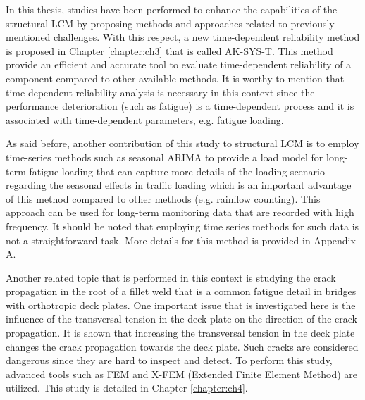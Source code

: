 In this thesis, studies have been performed to enhance the capabilities of the structural LCM by proposing methods and approaches related to previously mentioned challenges. With this respect,
a new time-dependent reliability method is proposed in Chapter \ref{chapter:ch3} that is called AK-SYS-T. This method provide an efficient and accurate tool to evaluate time-dependent reliability
of a component compared to other available methods. It is worthy to mention that time-dependent reliability analysis is necessary in this context since the performance deterioration (such as fatigue) 
is a time-dependent process and it is associated with time-dependent parameters, e.g. fatigue loading. 

As said before, another contribution of this study to structural LCM is to employ time-series methods such as seasonal ARIMA to provide a load model for long-term fatigue loading that can capture more 
details of the loading scenario regarding the seasonal effects in traffic loading which is an important advantage of this method compared to other methods (e.g. rainflow counting). This approach can be 
used for long-term monitoring data that are recorded with high frequency. It should be noted that employing time series methods for such data is not a straightforward task. More details for this method 
is provided in Appendix A. 

Another related topic that is performed in this context is studying the crack propagation in the root of a fillet weld that is a common fatigue detail in bridges with orthotropic deck plates. One important
issue that is investigated here is the influence of the transversal tension in the deck plate on the direction of the crack propagation. It is shown that increasing the transversal tension in the deck plate
changes the crack propagation towards the deck plate. Such cracks are considered dangerous since they are hard to inspect and detect. To perform this study, advanced tools such as FEM and X-FEM (Extended Finite 
Element Method) are utilized. This study is detailed in Chapter \ref{chapter:ch4}.



